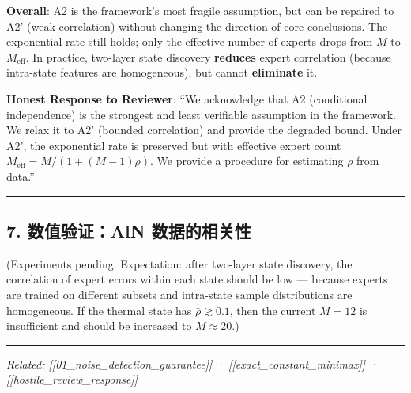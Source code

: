 \documentclass[
  12pt,
]{ctexart}
\begin{document}
\textbf{Overall}: A2 is the framework's most fragile assumption, but can be repaired to
A2' (weak correlation) without changing the direction of core conclusions. The exponential rate still holds; only the effective number of experts drops from
\(M\) to
\(M_{\text{eff}}\). In practice, two-layer state discovery \textbf{reduces} expert correlation (because intra-state features are homogeneous), but cannot \textbf{eliminate} it.

\textbf{Honest Response to Reviewer}: ``We acknowledge that A2 (conditional
independence) is the strongest and least verifiable assumption in the
framework. We relax it to A2' (bounded correlation) and provide the
degraded bound. Under A2', the exponential rate is preserved but with
effective expert count \(M_{\text{eff}} = M/(1+(M-1)\bar{\rho})\). We
provide a procedure for estimating \(\bar{\rho}\) from data.''

\begin{center}\rule{0.5\linewidth}{0.5pt}\end{center}

\subsection{7. 数值验证：AlN
数据的相关性}\label{ux6570ux503cux9a8cux8bc1aln-ux6570ux636eux7684ux76f8ux5173ux6027}

(Experiments pending. Expectation: after two-layer state discovery, the correlation of expert errors within each state should be low --- because experts are trained on different subsets and intra-state sample distributions are homogeneous. If
the thermal state has \(\hat{\bar{\rho}} \gtrsim 0.1\), then the current \(M=12\)
is insufficient and should be increased to \(M \approx 20\).)

\begin{center}\rule{0.5\linewidth}{0.5pt}\end{center}

\emph{Related: {[}{[}01\_noise\_detection\_guarantee{]}{]} ·
{[}{[}exact\_constant\_minimax{]}{]} ·
{[}{[}hostile\_review\_response{]}{]}}
\end{document}
